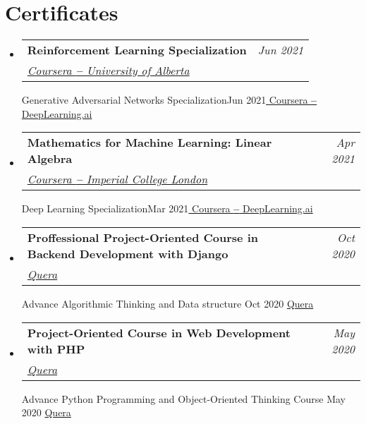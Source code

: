 \documentclass[letterpaper,11pt]{article}
\makeatletter
\newcommand{\resumeOrganizationHeading}[4]{
  \vspace{-2pt}\item
    \begin{tabular*}{0.97\textwidth}[t]{l@{\extracolsep{\fill}}r}
      \textbf{#1} & \textit{\small #2} \\
      \textit{\small#3}
    \end{tabular*}\vspace{-7pt}
}
\newcommand{\resumeSubHeadingListStart}{\begin{itemize}[leftmargin=0.15in, label={}]}
\newcommand{\resumeSubHeadingListEnd}{\end{itemize}}
\makeatother
\begin{document}

\section{Certificates}
\resumeSubHeadingListStart

\resumeOrganizationHeading
{Reinforcement Learning Specialization}{Jun 2021}{\href{https://coursera.org/share/38a7e63a9ebdbc73df6e85bcc6e10280}{\color{blue} Coursera \textbf{--} University of Alberta}}

\resumeOrganizationHeading
{Generative Adversarial Networks Specialization}{Jun 2021}{\href{https://coursera.org/share/f9336c54f7b154755888c616512824b8}{\color{blue} Coursera \textbf{--} DeepLearning.ai}}

\resumeOrganizationHeading
{Mathematics for Machine Learning: Linear Algebra}{Apr 2021}{\href{https://www.coursera.org/account/accomplishments/certificate/4Q3SNCJBQQ2D}{\color{blue}Coursera \textbf{--} Imperial College London}}

\resumeOrganizationHeading
{Deep Learning Specialization}{Mar 2021}{\href{https://www.coursera.org/account/accomplishments/specialization/certificate/ZVSQTA78X4DK}{\color{blue} Coursera \textbf{--} DeepLearning.ai}}


\resumeOrganizationHeading
{Proffessional Project-Oriented Course in Backend Development with Django} {Oct 2020}
{\href{https://quera.org/certificate/LcnssaOX/}{\color{blue}Quera}}


\resumeOrganizationHeading
{Advance Algorithmic Thinking and Data structure} {Oct 2020}
{\href{https://quera.org/certificate/TutKPvCg/}{\color{blue}Quera}}

\resumeOrganizationHeading
{Project-Oriented Course in Web Development with PHP} {May 2020}
{\href{https://quera.org/certificate/Au1OnMWM/}{\color{blue}Quera}}

\resumeOrganizationHeading
{Advance Python Programming and Object-Oriented Thinking Course} {May 2020}
{\href{https://quera.org/certificate/Au1OnMWM/}{\color{blue}Quera}}

\resumeSubHeadingListEnd




\end{document}
